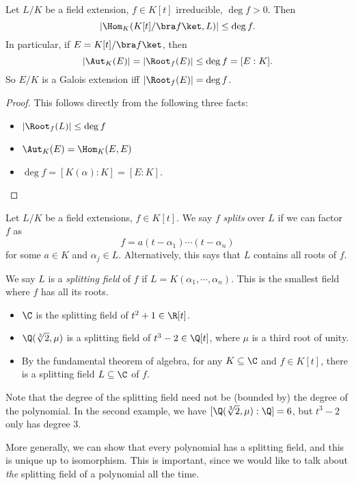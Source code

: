 \documentclass[a4paper]{article}
\begin{document}
\begin{cor}
  Let $L/K$ be a field extension, $f \in K[t]$ irreducible, $\deg f > 0$. Then
  \[
    \left| \Hom_K(K[t]/\bra f\ket, L) \right| \leq \deg f.
  \]
  In particular, if $E = K[t]/\bra f\ket$, then
  \[
    |\Aut_K(E)| = |\Root_f(E)| \leq \deg f = [E:K].
  \]
  So $E/K$ is a Galois extension iff $|\Root_f(E)| = \deg f$.
\end{cor}

\begin{proof}
  This follows directly from the following three facts:
  \begin{itemize}
    \item $|\Root_f(L)| \leq \deg f$
    \item $\Aut_K(E) = \Hom_K(E, E)$
    \item $\deg f = [K(\alpha): K] = [E:K]$.
  \end{itemize}
\end{proof}

\begin{defi}
  Let $L/K$ be a field extensions, $f\in K[t]$. We say $f$ \emph{splits} over $L$ if we can factor $f$ as
  \[
    f = a(t - \alpha_1)\cdots (t - \alpha_n)
  \]
  for some $a \in K$ and $\alpha_j \in L$. Alternatively, this says that $L$ contains all roots of $f$.

  We say $L$ is a \emph{splitting field} of $f$ if $L = K(\alpha_1, \cdots, \alpha_n)$. This is the smallest field where $f$ has all its roots.
\end{defi}

\begin{eg}\leavevmode
  \begin{itemize}
    \item $\C$ is the splitting field of $t^2 + 1 \in \R[t]$.
    \item $\Q(\sqrt[3]{2}, \mu)$ is a splitting field of $t^3 - 2 \in \Q[t]$, where $\mu$ is a third root of unity.
    \item By the fundamental theorem of algebra, for any $K\subseteq \C$ and $f\in K[t]$, there is a splitting field $L\subseteq \C$ of $f$.
  \end{itemize}
\end{eg}
Note that the degree of the splitting field need not be (bounded by) the degree of the polynomial. In the second example, we have $[\Q(\sqrt[3]{2}, \mu):\Q] = 6$, but $t^3 - 2$ only has degree 3.

More generally, we can show that every polynomial has a splitting field, and this is unique up to isomorphism. This is important, since we would like to talk about \emph{the} splitting field of a polynomial all the time.
\end{document}
